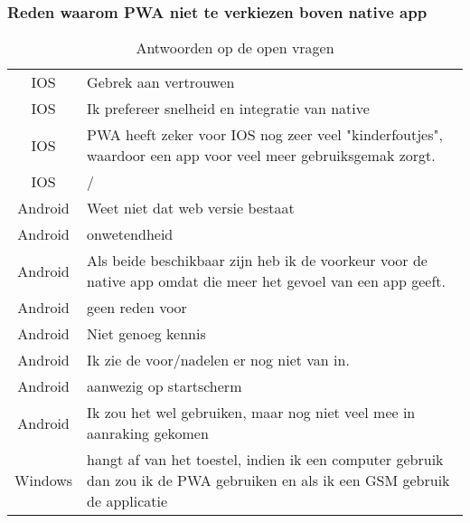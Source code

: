 	\subsubsection{Reden waarom PWA niet te verkiezen boven native app}
		\begin{table}[H]
			\centering
			\begin{tabular}{cp{12cm}}
				IOS & Gebrek aan vertrouwen \\
				IOS & Ik prefereer snelheid en integratie van native \\
				IOS & PWA heeft zeker voor IOS nog zeer veel "kinderfoutjes", waardoor een app voor veel meer gebruiksgemak zorgt. \\
				IOS & / \\
				Android & Weet niet dat web versie bestaat\\
				Android & onwetendheid\\
				Android & Als beide beschikbaar zijn heb ik de voorkeur voor de native app omdat die meer het gevoel van een app geeft.\\
				Android & geen reden voor\\
				Android & Niet genoeg kennis\\
				Android & Ik zie de voor/nadelen er nog niet van in.\\
				Android & aanwezig op startscherm\\
				Android & Ik zou het wel gebruiken, maar nog niet veel mee in
				aanraking gekomen \\
				Windows & hangt af van het toestel, indien ik een computer gebruik dan zou ik de PWA gebruiken en als ik een GSM gebruik de applicatie\\
			\end{tabular}	
			\caption{Antwoorden op de open vragen}
		\end{table}

	
	